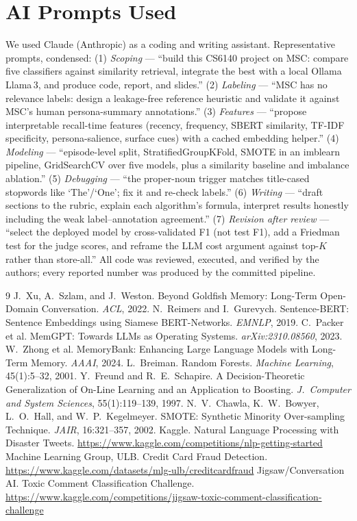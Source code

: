 \documentclass[11pt]{article}
\begin{document}
\section*{AI Prompts Used}
We used Claude (Anthropic) as a coding and writing assistant. Representative
prompts, condensed: (1) \emph{Scoping} --- ``build this CS6140 project on MSC:
compare five classifiers against similarity retrieval, integrate the best with a
local Ollama Llama\,3, and produce code, report, and slides.'' (2)
\emph{Labeling} --- ``MSC has no relevance labels: design a leakage-free reference
heuristic and validate it against MSC's human persona-summary annotations.'' (3)
\emph{Features} --- ``propose interpretable recall-time features (recency,
frequency, SBERT similarity, TF-IDF specificity, persona-salience, surface cues)
with a cached embedding helper.'' (4) \emph{Modeling} --- ``episode-level split,
StratifiedGroupKFold, SMOTE in an imblearn pipeline, GridSearchCV over five models,
plus a similarity baseline and imbalance ablation.'' (5) \emph{Debugging} ---
``the proper-noun trigger matches title-cased stopwords like `The'/`One'; fix it
and re-check labels.'' (6) \emph{Writing} --- ``draft sections to the rubric,
explain each algorithm's formula, interpret results honestly including the weak
label--annotation agreement.'' (7) \emph{Revision after review} --- ``select the
deployed model by cross-validated F1 (not test F1), add a Friedman test for the
judge scores, and reframe the LLM cost argument against top-$K$ rather than
store-all.'' All code was reviewed, executed, and verified by the authors; every
reported number was produced by the committed pipeline.

\begin{thebibliography}{9}
\small
{} J.~Xu, A.~Szlam, and J.~Weston. Beyond Goldfish Memory: Long-Term
Open-Domain Conversation. \emph{ACL}, 2022.
 N.~Reimers and I.~Gurevych. Sentence-BERT: Sentence Embeddings
using Siamese BERT-Networks. \emph{EMNLP}, 2019.
 C.~Packer et al. MemGPT: Towards LLMs as Operating Systems.
\emph{arXiv:2310.08560}, 2023.
 W.~Zhong et al. MemoryBank: Enhancing Large Language Models
with Long-Term Memory. \emph{AAAI}, 2024.
 L.~Breiman. Random Forests. \emph{Machine Learning}, 45(1):5--32,
2001.
 Y.~Freund and R.~E.~Schapire. A Decision-Theoretic
Generalization of On-Line Learning and an Application to Boosting.
\emph{J.\ Computer and System Sciences}, 55(1):119--139, 1997.
 N.~V.~Chawla, K.~W.~Bowyer, L.~O.~Hall, and W.~P.~Kegelmeyer.
SMOTE: Synthetic Minority Over-sampling Technique. \emph{JAIR}, 16:321--357, 2002.
 Kaggle. Natural Language Processing with Disaster Tweets.
\url{https://www.kaggle.com/competitions/nlp-getting-started}
 Machine Learning Group, ULB. Credit Card Fraud Detection.
\url{https://www.kaggle.com/datasets/mlg-ulb/creditcardfraud}
 Jigsaw/Conversation AI. Toxic Comment Classification
Challenge. \url{https://www.kaggle.com/competitions/jigsaw-toxic-comment-classification-challenge}
\end{thebibliography}
\end{document}
